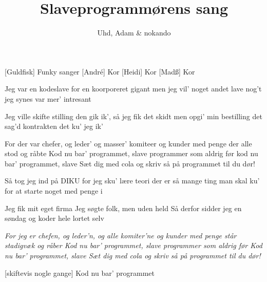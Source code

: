 \documentclass[a4paper,11pt]{article}
\title{Slaveprogrammørens sang}
\author{Uhd, Adam \& nokando}
\begin{document}
  \maketitle
  
  \begin{roles}
    [Guldfisk] Funky sanger
    [Andr\'e] Kor
    [Heidi] Kor
    [Madß] Kor
  \end{roles}

  

\begin{song}
Jeg var en kodeslave  
for en koorporeret gigant
men jeg vil' noget andet lave
nog't jeg synes var mer' intresant

Jeg ville skifte stilling
den gik ik', så jeg fik det skidt
men opgi' min bestilling
det sag'd kontrakten det ku' jeg ik'

For der var chefer, og leder' og masser' komiteer
og kunder med penge der alle stod og råbte
Kod nu bar' programmet, slave
programmer som aldrig før
kod nu bar' programmet, slave
Sæt dig med cola og skriv så på programmet til du dør!

 Så tog jeg ind på DIKU
for jeg sku' lære teori
der er så mange ting man skal ku'
for at starte noget med penge i

Jeg fik mit eget firma
Jeg søgte folk, men uden held
Så derfor sidder jeg en søndag
og koder hele lortet selv

\textit{For jeg er chefen, og leder'n, og alle komiter'ne
og kunder med penge står stadigvæk og råber
Kod nu bar' programmet, slave
programmer som aldrig før
Kod nu bar' programmet, slave
Sæt dig med cola og skriv så på programmet til du dør!}

[skiftevis nogle gange] Kod nu bar' programmet

    
\end{song}
\end{document}
